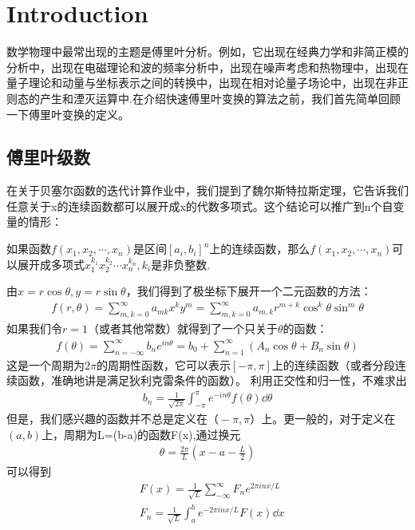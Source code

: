 \section{Introduction}
数学物理中最常出现的主题是傅里叶分析。例如，它出现在经典力学和非简正模的分析中，出现在电磁理论和波的频率分析中，出现在噪声考虑和热物理中，出现在量子理论和动量与坐标表示之间的转换中，出现在相对论量子场论中，出现在非正则态的产生和湮灭运算中.\cite{Ha}在介绍快速傅里叶变换的算法之前，我们首先简单回顾一下傅里叶变换的定义。
\subsection{傅里叶级数}
在关于贝塞尔函数的迭代计算作业中，我们提到了魏尔斯特拉斯定理，它告诉我们任意关于x的连续函数都可以展开成x的代数多项式。这个结论可以推广到n个自变量的情形：
\begin{tauenv}[frametitle=Generalized Stone-Weierstrass Theorem]
如果函数$f(x_1,x_2,\cdots,x_n)$是区间$[a_i,b_i]^n$上的连续函数，那么$f(x_1,x_2,\cdots,x_n)$可以展开成多项式$x_1^{k_1}x_2^{k_2}\cdots x_n^{k_n},k_i\text{是非负整数}$.
\end{tauenv}
由$x=r\cos\theta,y=r\sin\theta$，我们得到了极坐标下展开一个二元函数的方法：
\begin{align}
    f(r,\theta)=\sum_{m,k=0}^{\infty}a_{mk}x^ky^m=\sum_{m,k=0}^{\infty}a_{m,k}r^{m+k}\cos^k\theta\sin^m\theta
\end{align}
如果我们令$r=1$（或者其他常数）就得到了一个只关于$\theta$的函数：
\begin{align}
    f(\theta)=\sum_{n=-\infty}^{\infty}b_ne^{in\theta}
    =b_0+\sum_{n=1}^{\infty}(A_n\cos\theta+B_n\sin\theta)
\end{align}
这是一个周期为$2\pi$的周期性函数，它可以表示$[-\pi,\pi]$上的连续函数（或者分段连续函数，准确地讲是满足狄利克雷条件的函数）。
利用正交性和归一性，不难求出\cite{Ha}
\begin{align}
b_n=\frac{1}{\sqrt{2\pi}}\int_{-\pi}^{\pi}e^{-in\theta}f(\theta) \dd{\theta}
\end{align}
但是，我们感兴趣的函数并不总是定义在$（-\pi,\pi）$上。更一般的，对于定义在$(a,b)$上，周期为L=(b-a)的函数F(x),通过换元
\begin{align*}
    \theta =\frac{2\pi}{L}(x-a-\frac{L}{2})
\end{align*}
可以得到
\begin{align}
    &F(x)=\frac{1}{\sqrt{L}}\sum_{-\infty}^{\infty}F_n e^{2\pi inx/L}\\
    &F_n=\frac{1}{\sqrt{L}}\int_{a}^{b}e^{-2\pi inx/L}F(x)\dd{x}
\end{align}

